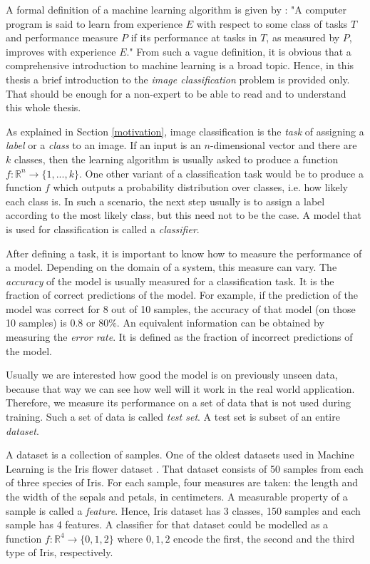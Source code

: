 A formal definition of a machine learning algorithm is given by \cite{Mitchell:1997:ML:541177}: "A computer program is said to learn from experience $E$ with respect to some class of tasks $T$ and performance measure $P$ if its performance at tasks in $T$, as measured by $P$, improves with experience $E$." 
From such a vague definition, it is obvious that a comprehensive introduction to machine learning is a broad topic. Hence, in this thesis a brief introduction to the \textit{image classification} problem is provided only. That should be enough for a non-expert to be able to read and to understand this whole thesis.

As explained in Section \ref{motivation}, image classification is the \textit{task} of assigning a \textit{label} or a \textit{class} to an image. If an input is an $n$-dimensional vector and there are $k$ classes, then the learning algorithm is usually asked to produce a function $f: \mathbb{R}^n \rightarrow \{1, ... , k\}$. One other variant of a classification task would be to produce a function $f$ which outputs a probability distribution over classes, i.e. how likely each class is. In such a scenario, the next step usually is to assign a label according to the most likely class, but this need not to be the case. A model that is used for classification is called a \textit{classifier}.

After defining a task, it is important to know how to measure the performance of a model. Depending on the domain of a system, this measure can vary. The \textit{accuracy} of the model is usually measured for a classification task. It is the fraction of correct predictions of the model. For example, if the prediction of the model was correct for 8 out of 10 samples, the accuracy of that model (on those 10 samples) is $0.8$ or $80\%$. An equivalent information can be obtained by measuring the \textit{error rate}. It is defined as the fraction of incorrect predictions of the model. 

Usually we are interested how good the model is on previously unseen data, because that way we can see how well will it work in the real world application. Therefore, we measure its performance on a set of data that is not used during training. Such a set of data is called \textit{test set}. A test set is subset of an entire \textit{dataset}.

A dataset is a collection of samples. One of the oldest datasets used in Machine Learning is the Iris flower dataset \cite{iris-dataset}. That dataset consists of 50 samples from each of three species of Iris. For each sample, four measures are taken: the length and the width of the sepals and petals, in centimeters. A measurable property of a sample is called a \textit{feature}. Hence, Iris dataset has 3 classes, 150 samples and each sample has 4 features. A classifier for that dataset could be modelled as a function $f: \mathbb{R}^4 \rightarrow \{0, 1, 2\}$ where $0, 1, 2$  encode the first, the second and the third type of Iris, respectively.

